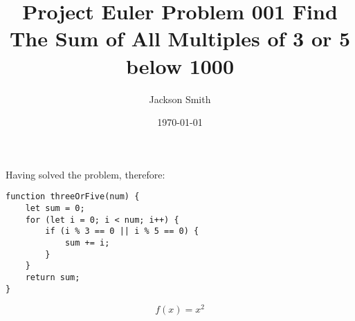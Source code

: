 \documentclass{article}
\author{Jackson Smith}
\title{Project Euler Problem 001
Find The Sum of All Multiples of 3 or 5 below 1000}
\date{\today}
\begin{document}
\maketitle

Having solved the problem, therefore: 

\begin{verbatim}
function threeOrFive(num) {
    let sum = 0; 
    for (let i = 0; i < num; i++) {
        if (i % 3 == 0 || i % 5 == 0) {
            sum += i; 
        }
    }
    return sum; 
}

\end{verbatim}




$$f(x)=x^2$$
\end{document}
